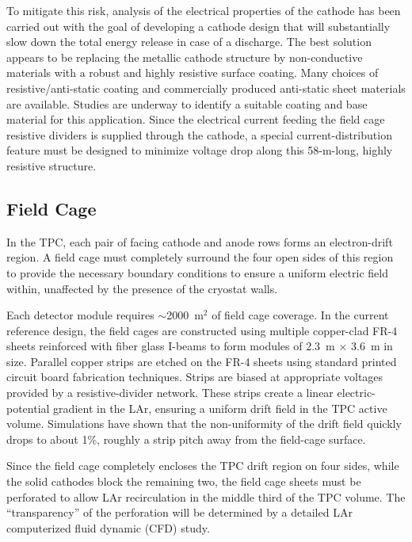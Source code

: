 To mitigate this risk, analysis of the electrical properties of the
cathode has been carried out with the goal of developing a cathode
design that will substantially slow down the total energy release in
case of a discharge.  The best solution appears to be replacing the
metallic cathode structure by non-conductive materials with a robust
and highly resistive surface coating.  Many choices of 
resistive/anti-static coating and commercially produced
anti-static sheet materials are available.  Studies are underway to identify a
suitable coating and base material for this application.  Since the
electrical current feeding the field cage resistive dividers is
supplied through the cathode, a special current-distribution feature
must be designed to minimize voltage drop along this 58-m-long, highly
resistive structure.


\subsection{Field Cage}
\label{subsec:fd-ref-fieldcage}

In the TPC, each pair of facing cathode and anode rows  forms an
electron-drift region. A field cage must completely surround the four
open sides of this region to provide the necessary boundary conditions
to ensure a uniform electric field within, unaffected by the presence
of the cryostat walls.


Each  detector module requires $\sim$2000~m$^2$ of field
cage coverage. In the current reference design, the field cages are
constructed using multiple copper-clad FR-4 sheets reinforced with
fiber glass I-beams to form modules of 2.3~m $\times$ 3.6~m in
size. Parallel copper strips are etched on the FR-4 sheets using
standard printed circuit board fabrication techniques. Strips are
biased at appropriate voltages provided by a resistive-divider 
network. These strips create a linear electric-potential gradient in
the LAr, ensuring a uniform drift field in the TPC active volume. 
Simulations have shown that the non-uniformity of the drift field quickly
drops to about 1\%, roughly a strip pitch away from the field-cage
surface.

Since the field cage completely encloses the TPC drift region on four
sides, while the solid cathodes block the remaining two, the field
cage sheets must be perforated to allow LAr recirculation in
the middle third of the TPC volume. The ``transparency'' of the
perforation will be determined by a detailed LAr computerized fluid
dynamic (CFD) study.

